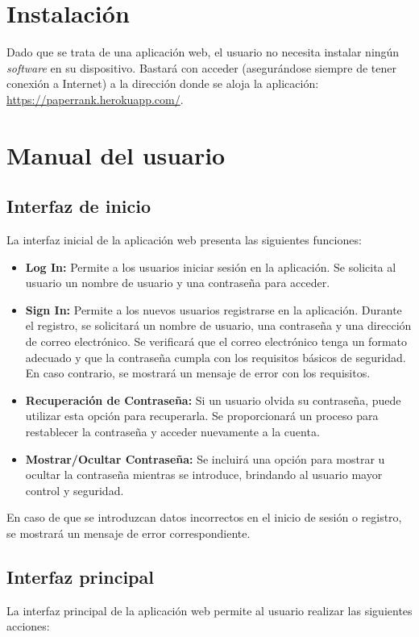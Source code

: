 \section{Instalación}
Dado que se trata de una aplicación web, el usuario no necesita instalar ningún \textit{software} en su dispositivo. Bastará con acceder (asegurándose siempre de tener conexión a Internet) a la dirección donde se aloja la aplicación: \url{https://paperrank.herokuapp.com/}.

\section{Manual del usuario}


\subsection{Interfaz de inicio}
La interfaz inicial de la aplicación web presenta las siguientes funciones:

\begin{itemize}
\item \textbf{Log In:} Permite a los usuarios iniciar sesión en la aplicación. Se solicita al usuario un nombre de usuario y una contraseña para acceder.
\item \textbf{Sign In:} Permite a los nuevos usuarios registrarse en la aplicación. Durante el registro, se solicitará un nombre de usuario, una contraseña y una dirección de correo electrónico. Se verificará que el correo electrónico tenga un formato adecuado y que la contraseña cumpla con los requisitos básicos de seguridad. En caso contrario, se mostrará un mensaje de error con los requisitos.
\item \textbf{Recuperación de Contraseña:} Si un usuario olvida su contraseña, puede utilizar esta opción para recuperarla. Se proporcionará un proceso para restablecer la contraseña y acceder nuevamente a la cuenta.
\item \textbf{Mostrar/Ocultar Contraseña:} Se incluirá una opción para mostrar u ocultar la contraseña mientras se introduce, brindando al usuario mayor control y seguridad.
\end{itemize}

En caso de que se introduzcan datos incorrectos en el inicio de sesión o registro, se mostrará un mensaje de error correspondiente.

\subsection{Interfaz principal}
La interfaz principal de la aplicación web permite al usuario realizar las siguientes acciones:

